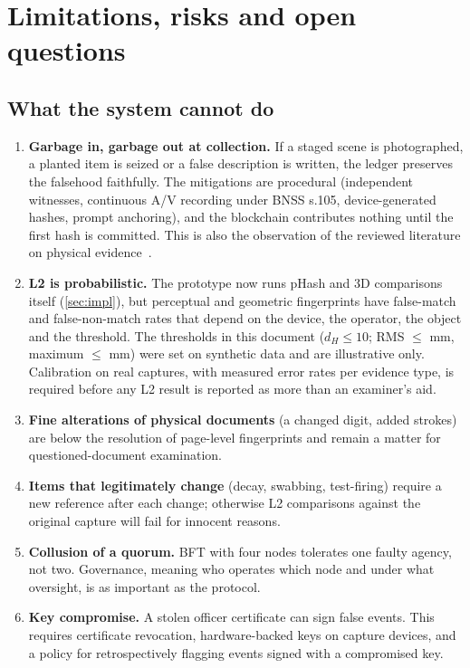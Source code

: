 \section{Limitations, risks and open questions}
\label{sec:limits}

\subsection{What the system cannot do}
\begin{enumerate}
  \item \textbf{Garbage in, garbage out at collection.} If a staged scene is photographed, a planted item is seized or a false description is written, the ledger preserves the falsehood faithfully. The mitigations are procedural (independent witnesses, continuous A/V recording under BNSS s.105, device-generated hashes, prompt anchoring), and the blockchain contributes nothing until the first hash is committed. This is also the observation of the reviewed literature on physical evidence~\cite{batista2023,patil2024}.
  \item \textbf{L2 is probabilistic.} The prototype now runs pHash and 3D comparisons itself (\cref{sec:impl}), but perceptual and geometric fingerprints have false-match and false-non-match rates that depend on the device, the operator, the object and the threshold. The thresholds in this document ($d_H \le 10$; RMS $\le$ \KnifeRuleRms{} mm, maximum $\le$ \KnifeRuleMax{} mm) were set on synthetic data and are illustrative only. Calibration on real captures, with measured error rates per evidence type, is required before any L2 result is reported as more than an examiner's aid.
  \item \textbf{Fine alterations of physical documents} (a changed digit, added strokes) are below the resolution of page-level fingerprints and remain a matter for questioned-document examination.
  \item \textbf{Items that legitimately change} (decay, swabbing, test-firing) require a new reference after each change; otherwise L2 comparisons against the original capture will fail for innocent reasons.
  \item \textbf{Collusion of a quorum.} BFT with four nodes tolerates one faulty agency, not two. Governance, meaning who operates which node and under what oversight, is as important as the protocol.
  \item \textbf{Key compromise.} A stolen officer certificate can sign false events. This requires certificate revocation, hardware-backed keys on capture devices, and a policy for retrospectively flagging events signed with a compromised key.

\end{enumerate}
